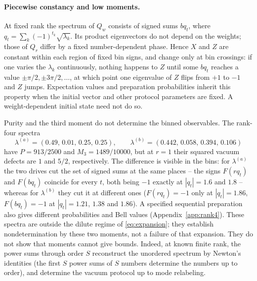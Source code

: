 \documentclass[11pt,a4paper]{article}
\begin{document}
\paragraph{Piecewise constancy and low moments.}
At fixed rank the spectrum of $Q_w$ consists of signed sums $bq_t$, where $q_t=\sum_k(-1)^{t_k}\sqrt{\lambda_k}$. Its product eigenvectors do not depend on the weights; those of $Q_r$ differ by a fixed number-dependent phase. Hence $X$ and $Z$ are constant within each region of fixed bin signs, and change only at bin crossings: if one varies the $\lambda_k$ continuously, nothing happens to $Z$ until some $bq_t$ reaches a value $\pm\pi/2,\pm3\pi/2,\dots$, at which point one eigenvalue of $Z$ flips from $+1$ to $-1$ and $Z$ jumps. Expectation values and preparation probabilities inherit this property when the initial vector and other protocol parameters are fixed. A weight-dependent initial state need not do so.

Purity and the third moment do not determine the binned observables. The rank-four spectra
\begin{equation}
\lambda^{(a)}=(0.49,\,0.01,\,0.25,\,0.25),\qquad
\lambda^{(b)}=(0.442,\,0.058,\,0.394,\,0.106)
\label{eq:pair}
\end{equation}
have $P=913/2500$ and $M_3=1489/10000$, but at $r=1$ their squared vacuum defects are $1$ and $5/2$, respectively. The difference is visible in the bins: for $\lambda^{(a)}$ the two drives cut the set of signed sums at the same places -- the signs $F(rq_t)$ and $F(bq_t)$ coincide for every $t$, both being $-1$ exactly at $|q_t|=1.6$ and $1.8$ -- whereas for $\lambda^{(b)}$ they cut it at different ones ($F(rq_t)=-1$ only at $|q_t|=1.86$, $F(bq_t)=-1$ at $|q_t|=1.21$, $1.38$ and $1.86$). A specified sequential preparation also gives different probabilities and Bell values (Appendix~\ref{app:rank4}). These spectra are outside the dilute regime of \eqref{eq:expansion}; they establish nondetermination by these two moments, not a failure of that expansion. They do not show that moments cannot give bounds. Indeed, at known finite rank, the power sums through order $S$ reconstruct the unordered spectrum by Newton's identities (the first $S$ power sums of $S$ numbers determine the numbers up to order), and determine the vacuum protocol up to mode relabeling.
\end{document}
